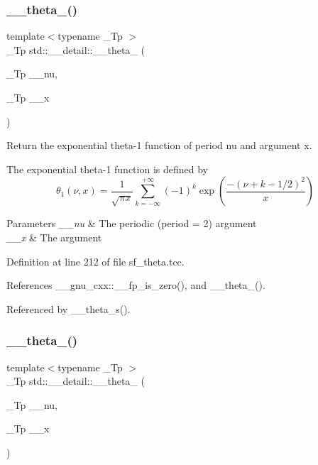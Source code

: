 \subsubsection{\texorpdfstring{\+\_\+\+\_\+theta\+\_()}{\_\_theta\_1()}}
{\footnotesize\ttfamily template$<$typename \+\_\+\+Tp $>$ \\
\+\_\+\+Tp std\+::\+\_\+\+\_\+detail\+::\+\_\+\+\_\+theta\+\_ (\begin{DoxyParamCaption}\item[{\+\_\+\+Tp}]{\+\_\+\+\_\+nu,  }\item[{\+\_\+\+Tp}]{\+\_\+\+\_\+x }\end{DoxyParamCaption})}

Return the exponential theta-\/1 function of period {\ttfamily nu} and argument {\ttfamily x}.

The exponential theta-\/1 function is defined by \[ \theta_1(\nu,x) = \frac{1}{\sqrt{\pi x}} \sum_{k=-\infty}^{+\infty} (-1)^k \exp\left( \frac{-(\nu + k - 1/2)^2}{x} \right) \]


\begin{DoxyParams}{Parameters}
{\em \+\_\+\+\_\+nu} & The periodic (period = 2) argument \\
\hline
{\em \+\_\+\+\_\+x} & The argument \\
\hline
\end{DoxyParams}


Definition at line 212 of file sf\+\_\+theta.\+tcc.



References \+\_\+\+\_\+gnu\+\_\+cxx\+::\+\_\+\+\_\+fp\+\_\+is\+\_\+zero(), and \+\_\+\+\_\+theta\+\_().



Referenced by \+\_\+\+\_\+theta\+\_\+s().

\mbox{\label{namespacestd_1_1____detail_ae783991fe49b94dff4ac9e3ebb446d4f}} 
\subsubsection{\texorpdfstring{\+\_\+\+\_\+theta\+\_()}{\_\_theta\_2()}}
{\footnotesize\ttfamily template$<$typename \+\_\+\+Tp $>$ \\
\+\_\+\+Tp std\+::\+\_\+\+\_\+detail\+::\+\_\+\+\_\+theta\+\_ (\begin{DoxyParamCaption}\item[{\+\_\+\+Tp}]{\+\_\+\+\_\+nu,  }\item[{\+\_\+\+Tp}]{\+\_\+\+\_\+x }\end{DoxyParamCaption})}


